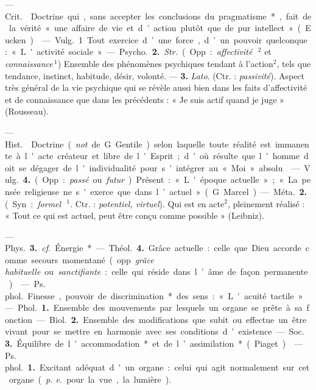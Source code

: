 \begin{itemize}[leftmargin=1cm, label=, itemsep=1pt]
 — \si{Crit.}  Doctrine qui, 
sans accepter les conclusions du
pragmatisme*, fait de la vérité
« une affaire de vie et d’action plutôt
que de pur intellect » (Eucken).

 — \si{Vulg.} 1 Tout exercice
d’une force, d’un pouvoir quelconque : « L'activité sociale ».

— \si{Psycho.} {\bf 2.} {\it Str.} (Opp. : {\it affectivité}\,$^2$ et {\it connaissance}\,$^1$) Ensemble
des phénomènes psychiques tendant
à l’action$^2$, tels que tendance, instinct, habitude, désir, volonté. —
 {\bf 3.} {\it Lato}. (Ctr. : {\it passivité}). Aspect
très général de la vie psychique qui
se révèle aussi bien dans les faits
d’affectivité et de connaissance que
dans les précédents : « Je suis actif
quand je juge » (Rousseau).

 — \si{Hist.}  Doctrine ({\it not}.
de G. Gentile) selon laquelle toute
réalité est immanente à l'acte créateur et libre de l'Esprit; d’où résulte
que l'homme doit se dégager de
l'individualité pour s'intégrer au
« Moi » absolu.

 — \si{Vulg.} {\bf 4.} (Opp. : {\it passé} ou
{\it futur}). Présent : « L'époque actuelle » ;
« La pensée religieuse ne s'exerce que
dans l’actuel » (G. Marcel).

— \si{Méta.} {\bf 2.} (Syn. : {\it formel}\,$^1$. Ctr. :
{\it potentiel, virtuel}). Qui est en acte$^2$,
pleinement réalisé : « Tout ce qui est
actuel, peut être conçu comme possible » (Leibniz).

— \si{Phys.} {\bf 3.} {\it cf.}  Énergie*.

— \si{Théol.} {\bf 4.} Grâce actuelle : celle
que Dieu accorde comme secours
momentané (opp. {\it grâce habituelle} ou
{\it sanctifiante} : celle qui réside dans
l’âme de façon permanente).

 — \si{Ps. phol.} Finesse,
pouvoir de discrimination* des sens :
« L'acuité tactile ».

 — \si{Phol.} {\bf 1.} Ensemble des
mouvements par lesquels un organe
se prête à sa fonction.

— \si{Biol.} {\bf 2.} Ensemble des modifications que subit ou effectue un être
vivant pour se mettre en harmonie
avec ses conditions d'existence.

— \si{Soc.} {\bf 3.} Équilibre de l’accommodation* et de l’assimilation* (Piaget).

 — \si{Ps. phol.} {\bf 1.} Excitant adéquat d'un organe : celui qui agit
normalement sur cet organe ({\it p. e.}
pour la vue, la lumière).


\end{itemize}
